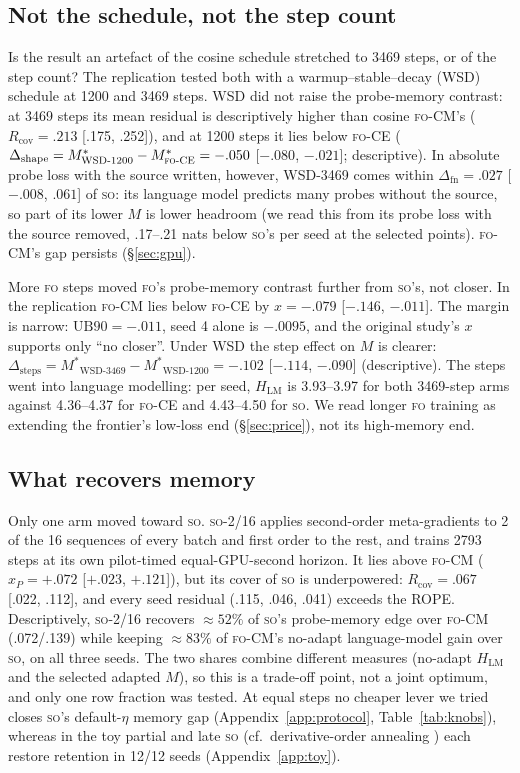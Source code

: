 \documentclass[11pt]{article}
\newcommand{\FO}{\textsc{fo}}
\newcommand{\SO}{\textsc{so}}
\newcommand{\SOp}{\textsc{so}-2/16}
\newcommand{\Mstar}{\ensuremath{M^{\ast}}}
\newcommand{\Rcov}{\ensuremath{R_{\mathrm{cov}}}}
\newcommand{\UB}{\ensuremath{\mathrm{UB90}}}
\begin{document}
\subsection{Not the schedule, not the step count}
\label{sec:steps}

Is the result an artefact of the cosine schedule stretched to 3469 steps, or of the step count? The
replication tested both with a warmup--stable--decay (WSD) schedule at 1200 and 3469 steps. WSD did
not raise the probe-memory contrast: at 3469 steps its mean residual is descriptively higher than
cosine \FO-CM's ($\Rcov=.213$ [.175, .252]), and at 1200 steps it lies below \FO-CE{}
($\Delta_{\text{shape}}=\Mstar_{\text{WSD-1200}}-\Mstar_{\FO\text{-CE}} =-.050$ [$-.080$, $-.021$];
descriptive). In absolute probe loss with the source written, however, WSD-3469 comes within
$\Delta_{\text{fn}}=.027$ [$-.008$, $.061$] of \SO: its language model predicts many probes without the
source, so part of its lower $M$ is lower headroom (we read this from its probe loss with the source
removed, .17--.21 nats below \SO's per seed at the selected points). \FO-CM's gap persists
(\S\ref{sec:gpu}).

More \FO{} steps moved \FO's probe-memory contrast further from \SO's, not closer. In the replication \FO-CM{} lies
below \FO-CE{} by $x=-.079$ [$-.146$, $-.011$]. The margin is narrow: $\UB=-.011$, seed 4 alone is $-.0095$, and the original study's $x$ supports
only ``no closer''. Under WSD the step effect on $M$ is clearer:
$\Delta_{\text{steps}}=\Mstar_{\text{WSD-3469}}-\Mstar_{\text{WSD-1200}}=-.102$ [$-.114$, $-.090$]
(descriptive). The steps went into language modelling: per seed, $H_{\text{LM}}$ is 3.93--3.97
for both 3469-step arms against 4.36--4.37 for \FO-CE{} and 4.43--4.50 for \SO. We read longer \FO{} training as extending the frontier's low-loss end (\S\ref{sec:price}),
not its high-memory end.

\subsection{What recovers memory}
\label{sec:recover}

Only one arm moved toward \SO. \SOp{} applies second-order meta-gradients to 2 of the 16 sequences of
every batch and first order to the rest, and trains 2793 steps at its own pilot-timed
equal-GPU-second horizon. It lies above \FO-CM{} ($x_P=+.072$ [$+.023$, $+.121$]), but its cover of
\SO{} is underpowered: $\Rcov=.067$ [.022, .112], and every seed residual (.115, .046, .041) exceeds
the ROPE. Descriptively, \SOp{} recovers $\approx52\%$ of \SO's probe-memory edge over \FO-CM{}
(.072/.139) while keeping $\approx83\%$ of \FO-CM's no-adapt language-model gain over \SO, on all three
seeds. The two shares combine different measures (no-adapt $H_{\text{LM}}$ and the selected adapted
$M$), so this is a trade-off point, not a joint optimum, and only one row fraction was tested. At
equal steps no cheaper lever we tried closes \SO's default-$\eta$ memory gap
(Appendix~\ref{app:protocol}, Table~\ref{tab:knobs}), whereas in the toy partial and late \SO{} (cf.\
derivative-order annealing \citep{antoniou2019maml}) each restore retention in 12/12 seeds
(Appendix~\ref{app:toy}).
\end{document}
